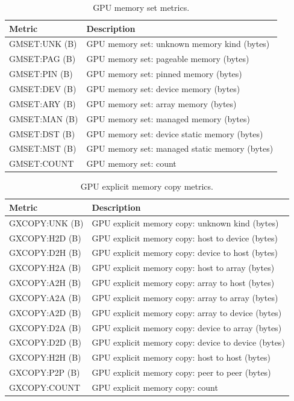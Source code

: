 \begin{table}[t]
\centering
\begin{tabular}{|l|l|}\hline
Metric & Description\\\hline\hline
 GMSET:UNK (B)  &  GPU memory set: unknown memory kind (bytes)  \\\hline
  GMSET:PAG (B)  &  GPU memory set: pageable memory (bytes)  \\\hline
  GMSET:PIN (B)  &  GPU memory set: pinned memory (bytes)  \\\hline
  GMSET:DEV (B)  &  GPU memory set: device memory (bytes)  \\\hline
  GMSET:ARY (B)  &  GPU memory set: array memory (bytes)  \\\hline
  GMSET:MAN (B)  &  GPU memory set: managed memory (bytes)  \\\hline
  GMSET:DST (B)  &  GPU memory set: device static memory (bytes)  \\\hline
  GMSET:MST (B)  &  GPU memory set: managed static memory (bytes)  \\\hline
  GMSET:COUNT  &  GPU memory set: count  \\\hline
\end{tabular}
\caption{GPU memory set metrics.}
\label{table:gmset}
\end{table}

\begin{table}[t]
\centering
\begin{tabular}{|l|l|}\hline
Metric & Description\\\hline\hline
 GXCOPY:UNK (B)  &  GPU explicit memory copy: unknown kind (bytes)  \\\hline
  GXCOPY:H2D (B)  &  GPU explicit memory copy: host to device (bytes)  \\\hline
  GXCOPY:D2H (B)  &  GPU explicit memory copy: device to host (bytes)  \\\hline
  GXCOPY:H2A (B)  &  GPU explicit memory copy: host to array (bytes)  \\\hline
  GXCOPY:A2H (B)  &  GPU explicit memory copy: array to host (bytes)  \\\hline
  GXCOPY:A2A (B)  &  GPU explicit memory copy: array to array (bytes)  \\\hline
  GXCOPY:A2D (B)  &  GPU explicit memory copy: array to device (bytes)  \\\hline
  GXCOPY:D2A (B)  &  GPU explicit memory copy: device to array (bytes)  \\\hline
  GXCOPY:D2D (B)  &  GPU explicit memory copy: device to device (bytes)  \\\hline
  GXCOPY:H2H (B)  &  GPU explicit memory copy: host to host (bytes)  \\\hline
  GXCOPY:P2P (B)  &  GPU explicit memory copy: peer to peer (bytes)  \\\hline
  GXCOPY:COUNT  &  GPU explicit memory copy: count  \\\hline
\end{tabular}
\caption{GPU explicit memory copy metrics.}
\label{table:gxcopy}
\end{table}


